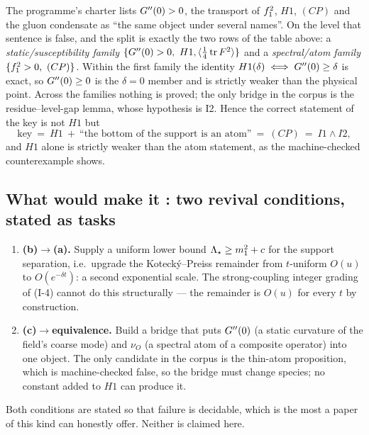The programme's charter lists $G''(0)>0$, the transport of $f_1^2$, $H1$, $(CP)$ and the gluon
condensate as ``the same object under several names''. On the \LT{} level that sentence is false,
and the split is exactly the two rows of the table above: a \emph{static/susceptibility family}
$\{G''(0)>0,\ H1,\langle\tfrac14\operatorname{tr} F^{2}\rangle\}$ and a \emph{spectral/atom family}
$\{f_1^2>0,\ (CP)\}$. Within the first family the identity $H1(\delta)\iff G''(0)\ge\delta$ is exact,
so $G''(0)\ge0$ is the $\delta=0$ member and is strictly weaker than the physical point. Across the
families nothing is proved; the only bridge in the corpus is the residue--level-gap lemma, whose
hypothesis is I2. \LC{} Hence the correct statement of the key is not $H1$ but
\begin{equation}
\text{key}\ =\ H1\ +\ \text{``the bottom of the support is an atom''}\ =\ (CP)\ =\ I1\wedge I2 ,
\label{eq:key5}
\end{equation}
and $H1$ alone is strictly weaker than the atom statement, as the machine-checked counterexample
shows.


\subsection{What would make it \LT: two revival conditions, stated as tasks}

\begin{enumerate}
\item \textbf{(b)$\to$(a).} Supply a uniform lower bound $\Lambda_{\star}\ge m_1^{2}+c$ for the support
  separation, i.e.\ upgrade the Koteck\'y--Preiss remainder from $t$-uniform $O(u)$ to
  $O(e^{-\delta t})$: a second exponential scale. The strong-coupling integer grading of (I-4)
  cannot do this structurally --- the remainder is $O(u)$ for every $t$ by construction.
\item \textbf{(c)$\to$equivalence.} Build a bridge that puts $G''(0)$ (a static curvature of the
  field's coarse mode) and $\nu_O$ (a spectral atom of a composite operator) into one object. The
  only candidate in the corpus is the thin-atom proposition, which is machine-checked false, so
  the bridge must change species; no constant added to $H1$ can produce it.
\end{enumerate}
Both conditions are stated so that failure is decidable, which is the most a paper of this kind
can honestly offer. Neither is claimed here.

